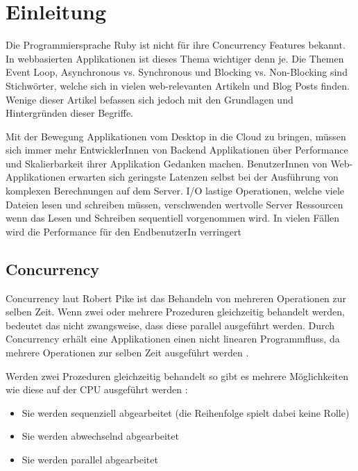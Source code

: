 \section{Einleitung}
\label{section:Einleitung}

Die Programmiersprache Ruby ist nicht für ihre Concurrency Features bekannt. In webbasierten Applikationen ist dieses Thema wichtiger denn je. Die Themen Event Loop, Asynchronous vs. Synchronous und Blocking vs. Non-Blocking sind Stichwörter, welche sich in vielen web-relevanten Artikeln und Blog Posts finden. Wenige dieser Artikel befassen sich jedoch mit den Grundlagen und Hintergründen dieser Begriffe. 

Mit der Bewegung Applikationen vom Desktop in die Cloud zu bringen, müssen sich immer mehr EntwicklerInnen von Backend Applikationen über Performance und Skalierbarkeit ihrer Applikation Gedanken machen. BenutzerInnen von Web-Applikationen erwarten sich geringste Latenzen selbst bei der Ausführung von komplexen Berechnungen auf dem Server. I/O lastige Operationen, welche viele Dateien lesen und schreiben müssen, verschwenden wertvolle Server Ressourcen wenn das Lesen und Schreiben sequentiell vorgenommen wird. In vielen Fällen wird  die Performance für den EndbenutzerIn verringert

\subsection{Concurrency}
\label{section:concurrency}

Concurrency laut Robert Pike ist das Behandeln von mehreren Operationen zur selben Zeit. Wenn zwei oder mehrere Prozeduren gleichzeitig behandelt werden, bedeutet das nicht zwangsweise, dass diese parallel ausgeführt werden. Durch Concurrency erhält eine Applikationen einen nicht linearen Programmfluss, da mehrere Operationen zur selben Zeit ausgeführt werden \cite[]{Pik2013}.

Werden zwei Prozeduren gleichzeitig behandelt so gibt es mehrere Möglichkeiten wie diese auf der CPU ausgeführt werden \cite[p. 14]{Erb2012}:

\begin{itemize}
  \item Sie werden sequenziell abgearbeitet (die Reihenfolge spielt dabei keine Rolle)
  \item Sie werden abwechselnd abgearbeitet
  \item Sie werden parallel abgearbeitet
\end{itemize}

